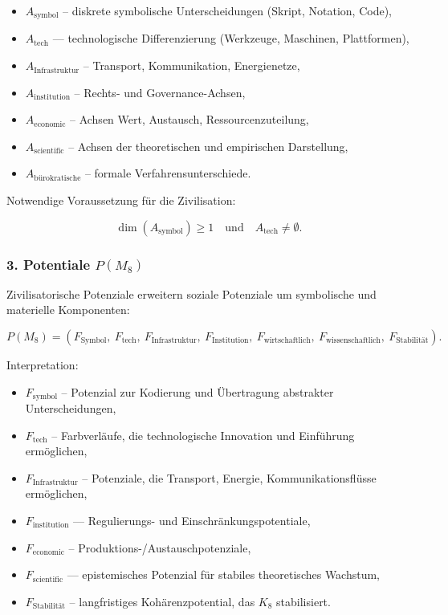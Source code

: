 \begin{itemize}
    \item $A_{\mathrm{symbol}}$ – diskrete symbolische Unterscheidungen (Skript, Notation, Code),
    \item $A_{\mathrm{tech}}$ — technologische Differenzierung (Werkzeuge, Maschinen, Plattformen),
    \item $A_{\mathrm{Infrastruktur}}$ – Transport, Kommunikation, Energienetze,
    \item $A_{\mathrm{institution}}$ – Rechts- und Governance-Achsen,
    \item $A_{\mathrm{economic}}$ – Achsen Wert, Austausch, Ressourcenzuteilung,
    \item $A_{\mathrm{scientific}}$ – Achsen der theoretischen und empirischen Darstellung,
    \item $A_{\mathrm{bürokratische}}$ – formale Verfahrensunterschiede.
\end{itemize}

Notwendige Voraussetzung für die Zivilisation:

\[
\dim(A_{\mathrm{symbol}}) \ge 1
\quad\text{und}\quad
A_{\mathrm{tech}}\neq\emptyset.
\]

\subsubsection*{3. Potentiale \texorpdfstring{$P(M_8)$}{P(M_8)}}

Zivilisatorische Potenziale erweitern soziale Potenziale um symbolische und materielle Komponenten:

\[
P(M_8)=
(F_{\mathrm{Symbol}},\
F_{\mathrm{tech}},\
F_{\mathrm{Infrastruktur}},\
F_{\mathrm{Institution}},\
F_{\mathrm{wirtschaftlich}},\
F_{\mathrm{wissenschaftlich}},\
F_{\mathrm{Stabilität}}).
\]

Interpretation:

\begin{itemize}
    \item $F_{\mathrm{symbol}}$ – Potenzial zur Kodierung und Übertragung abstrakter Unterscheidungen,
    \item $F_{\mathrm{tech}}$ – Farbverläufe, die technologische Innovation und Einführung ermöglichen,
    \item $F_{\mathrm{Infrastruktur}}$ – Potenziale, die Transport, Energie, Kommunikationsflüsse ermöglichen,
    \item $F_{\mathrm{institution}}$ — Regulierungs- und Einschränkungspotentiale,
    \item $F_{\mathrm{economic}}$ – Produktions-/Austauschpotenziale,
    \item $F_{\mathrm{scientific}}$ — epistemisches Potenzial für stabiles theoretisches Wachstum,
    \item $F_{\mathrm{Stabilität}}$ – langfristiges Kohärenzpotential, das $K_8$ stabilisiert.
\end{itemize}

